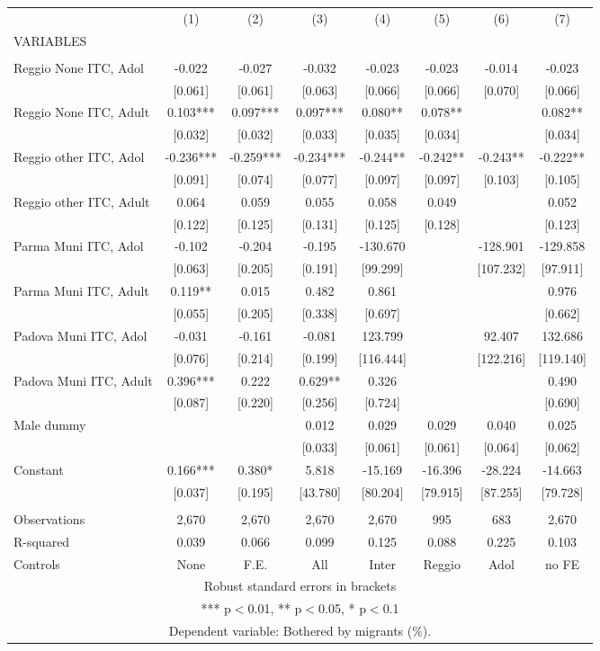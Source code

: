 \begin{tabular}{lccccccc} \hline
 & (1) & (2) & (3) & (4) & (5) & (6) & (7) \\
VARIABLES &  &  &  &  &  &  &  \\ \hline
 &  &  &  &  &  &  &  \\
Reggio None ITC, Adol & -0.022 & -0.027 & -0.032 & -0.023 & -0.023 & -0.014 & -0.023 \\
 & [0.061] & [0.061] & [0.063] & [0.066] & [0.066] & [0.070] & [0.066] \\
Reggio None ITC, Adult & 0.103*** & 0.097*** & 0.097*** & 0.080** & 0.078** &  & 0.082** \\
 & [0.032] & [0.032] & [0.033] & [0.035] & [0.034] &  & [0.034] \\
Reggio other ITC, Adol & -0.236*** & -0.259*** & -0.234*** & -0.244** & -0.242** & -0.243** & -0.222** \\
 & [0.091] & [0.074] & [0.077] & [0.097] & [0.097] & [0.103] & [0.105] \\
Reggio other ITC, Adult & 0.064 & 0.059 & 0.055 & 0.058 & 0.049 &  & 0.052 \\
 & [0.122] & [0.125] & [0.131] & [0.125] & [0.128] &  & [0.123] \\
Parma Muni ITC, Adol & -0.102 & -0.204 & -0.195 & -130.670 &  & -128.901 & -129.858 \\
 & [0.063] & [0.205] & [0.191] & [99.299] &  & [107.232] & [97.911] \\
Parma Muni ITC, Adult & 0.119** & 0.015 & 0.482 & 0.861 &  &  & 0.976 \\
 & [0.055] & [0.205] & [0.338] & [0.697] &  &  & [0.662] \\
Padova Muni ITC, Adol & -0.031 & -0.161 & -0.081 & 123.799 &  & 92.407 & 132.686 \\
 & [0.076] & [0.214] & [0.199] & [116.444] &  & [122.216] & [119.140] \\
Padova Muni ITC, Adult & 0.396*** & 0.222 & 0.629** & 0.326 &  &  & 0.490 \\
 & [0.087] & [0.220] & [0.256] & [0.724] &  &  & [0.690] \\
Male dummy &  &  & 0.012 & 0.029 & 0.029 & 0.040 & 0.025 \\
 &  &  & [0.033] & [0.061] & [0.061] & [0.064] & [0.062] \\
Constant & 0.166*** & 0.380* & 5.818 & -15.169 & -16.396 & -28.224 & -14.663 \\
 & [0.037] & [0.195] & [43.780] & [80.204] & [79.915] & [87.255] & [79.728] \\
 &  &  &  &  &  &  &  \\
Observations & 2,670 & 2,670 & 2,670 & 2,670 & 995 & 683 & 2,670 \\
R-squared & 0.039 & 0.066 & 0.099 & 0.125 & 0.088 & 0.225 & 0.103 \\
 Controls & None & F.E. & All & Inter & Reggio & Adol & no FE \\ \hline
\multicolumn{8}{c}{ Robust standard errors in brackets} \\
\multicolumn{8}{c}{ *** p$<$0.01, ** p$<$0.05, * p$<$0.1} \\
\multicolumn{8}{c}{ Dependent variable: Bothered by migrants (\%).} \\
\end{tabular}

